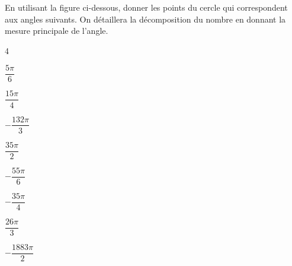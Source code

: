 \documentclass[11pt,a4paper]{article}  %
\begin{document}
	\graphicspath{{images/}}
	
	\begin{center}
		
		
	\end{center}



En utilisant la figure ci-dessous, donner les points du cercle qui correspondent aux angles suivants. On détaillera la décomposition du nombre en donnant la mesure principale de l'angle.
\begin{multicols}{4}
	\begin{enumMet}
		\item $\dfrac{5\pi}{6}$
		\item $\dfrac{15\pi}{4}$
		\item $-\dfrac{132\pi}{3}$
		\item $\dfrac{35\pi}{2}$
		\item $-\dfrac{55\pi}{6}$
		\item $-\dfrac{35\pi}{4}$
		\item $\dfrac{26\pi}{3}$
		\item $-\dfrac{1883\pi}{2}$
	\end{enumMet}
\end{multicols}
\ \\
\end{document}
